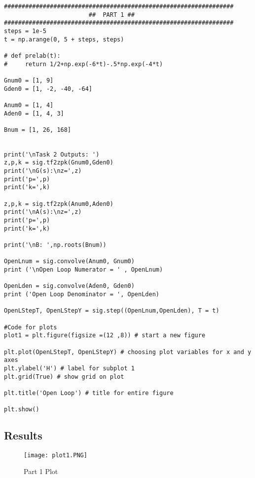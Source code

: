 \begin{scriptsize}
\begin{lstlisting}
#################################################################
                        ##  PART 1 ##
#################################################################
steps = 1e-5
t = np.arange(0, 5 + steps, steps) 

# def prelab(t):
#     return 1/2+np.exp(-6*t)-.5*np.exp(-4*t)

Gnum0 = [1, 9]
Gden0 = [1, -2, -40, -64]

Anum0 = [1, 4]
Aden0 = [1, 4, 3]

Bnum = [1, 26, 168]


print('\nTask 2 Outputs: ')
z,p,k = sig.tf2zpk(Gnum0,Gden0)
print('\nG(s):\nz=',z)
print('p=',p)
print('k=',k)

z,p,k = sig.tf2zpk(Anum0,Aden0)
print('\nA(s):\nz=',z)
print('p=',p)
print('k=',k)

print('\nB: ',np.roots(Bnum))

OpenLnum = sig.convolve(Anum0, Gnum0)
print ('\nOpen Loop Numerator = ' , OpenLnum)

OpenLden = sig.convolve(Aden0, Gden0)
print ('Open Loop Denominator = ', OpenLden)

OpenLStepT, OpenLStepY = sig.step((OpenLnum,OpenLden), T = t)

#Code for plots
plot1 = plt.figure(figsize =(12 ,8)) # start a new figure

plt.plot(OpenLStepT, OpenLStepY) # choosing plot variables for x and y axes
plt.ylabel('H') # label for subplot 1
plt.grid(True) # show grid on plot

plt.title('Open Loop') # title for entire figure 

plt.show()
\end{lstlisting}
\end{scriptsize}

\subsection{Results}

 \begin{figure}[H]
   \centering
   \texttt{[image: plot1.PNG]}
   \caption{Part 1 Plot}
 \end{figure}

